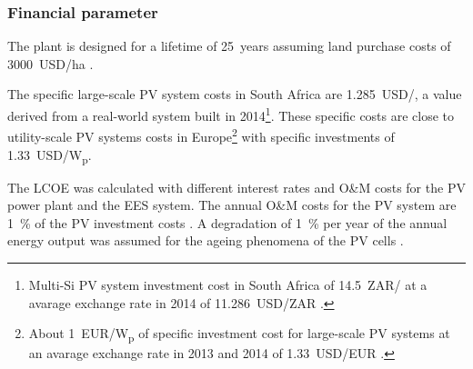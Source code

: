 \subsubsection{Financial parameter} \label{SUBSUBPVFinancialparameter}

The plant is designed for a lifetime of \SI{25}{years} assuming land purchase costs of \SI{3000}{USD/\hectare} \cite{Cassell2012}.


The specific large-scale PV system costs in South Africa are \SI{1.285}{USD/\wattp}, a value derived from a real-world system built in 2014\footnote{Multi-Si PV system investment cost in South Africa of \SI{14.5}{ZAR/\wattp} \cite{Terblanche2015} at a avarage exchange rate in 2014 of \SI{11.286}{USD/ZAR} \cite{IRS2015}.}. These specific costs are close to utility-scale PV systems costs in Europe\footnote{About \SI{1}{EUR/W}\textsubscript{p} of specific investment cost for large-scale PV systems \cite{FraunhoferISE2013} at an avarage exchange rate in 2013 and 2014 of \SI{1.33}{USD/EUR} \cite{StatistaGmbH2015}.} with specific investments of \SI{1.33}{USD/W}\textsubscript{p}.


The LCOE was calculated with different interest rates and O\&M costs for the PV power plant and the EES system. The annual O\&M costs for the PV system are \SI{1}{\percent}  of the PV investment costs \cite{IEA2014a}. A degradation of \SI{1}{\percent} per year of the annual energy output was assumed for the ageing phenomena of the PV cells \cite{Tidball2010}.

